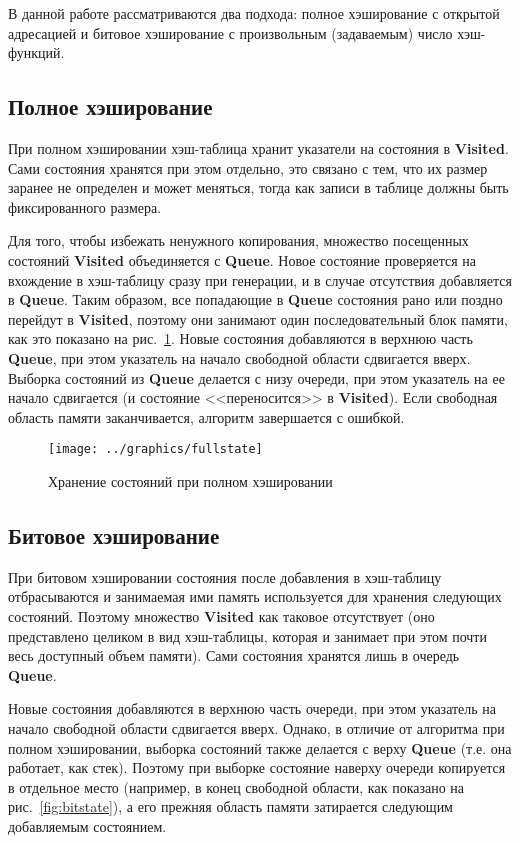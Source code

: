 \documentclass[12pt,a4paper,fleqn]{article}
\newcommand{\Code}[1]{\textbf{\mbox{#1}}}
\begin{document}
В данной работе рассматриваются два подхода: полное хэширование с открытой адресацией и
битовое хэширование с произвольным (задаваемым) число хэш-функций.

\subsection{Полное хэширование}

При полном хэшировании хэш-таблица хранит указатели на состояния в \Code{Visited}. Сами
состояния хранятся при этом отдельно, это связано с тем, что их размер заранее не
определен и может меняться, тогда как записи в таблице должны быть фиксированного размера.

Для того, чтобы избежать ненужного копирования, множество посещенных состояний \Code{Visited}
объединяется с \Code{Queue}. Новое состояние проверяется на вхождение в хэш-таблицу сразу при
генерации, и в случае отсутствия добавляется в \Code{Queue}. Таким образом, все попадающие в
\Code{Queue} состояния рано или поздно перейдут в \Code{Visited}, поэтому они занимают один
последовательный блок памяти, как это показано на рис.~\ref{fig:fullstate}. Новые состояния
добавляются в верхнюю часть \Code{Queue}, при этом указатель на начало свободной области сдвигается
вверх. Выборка состояний из \Code{Queue} делается с низу очереди, при этом указатель на ее начало
сдвигается (и состояние <<переносится>> в \Code{Visited}). Если свободная область памяти
заканчивается, алгоритм завершается с ошибкой.

\begin{figure}[ht]
  \centering
  \texttt{[image: ../graphics/fullstate]}
  \caption{Хранение состояний при полном хэшировании}
  \label{fig:fullstate}
\end{figure}

\subsection{Битовое хэширование}
\label{sec:bithash-store}

При битовом хэшировании состояния после добавления в хэш-таблицу отбрасываются и занимаемая ими
память используется для хранения следующих состояний. Поэтому множество \Code{Visited} как таковое
отсутствует (оно представлено целиком в вид хэш-таблицы, которая и занимает при этом почти весь
доступный объем памяти). Сами состояния хранятся лишь в очередь \Code{Queue}.

Новые состояния добавляются в верхнюю часть очереди, при этом указатель на начало
свободной области сдвигается вверх. Однако, в отличие от алгоритма при полном хэшировании,
выборка состояний также делается с верху \Code{Queue} (т.е. она работает, как
стек). Поэтому при выборке состояние наверху очереди копируется в отдельное место
(например, в конец свободной области, как показано на рис.~\ref{fig:bitstate}), а его
прежняя область памяти затирается следующим добавляемым состоянием.
\end{document}
